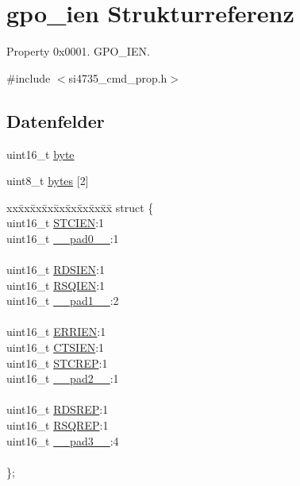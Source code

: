 \hypertarget{uniongpo__ien}{}\section{gpo\+\_\+ien Strukturreferenz}
\label{uniongpo__ien}


Property 0x0001. G\+P\+O\+\_\+\+I\+E\+N.  




{\ttfamily \#include $<$si4735\+\_\+cmd\+\_\+prop.\+h$>$}

\subsection*{Datenfelder}
\begin{DoxyCompactItemize}
\item 
uint16\+\_\+t \hyperlink{uniongpo__ien_ab0549c1b5ea980a02e7eab77e21fea49}{byte}
\item 
uint8\+\_\+t \hyperlink{uniongpo__ien_a46e4c05d20a047ec169f60d3167e912e}{bytes} \mbox{[}2\mbox{]}
\item 
\begin{tabbing}
xx\=xx\=xx\=xx\=xx\=xx\=xx\=xx\=xx\=\kill
struct \{\\
\>uint16\_t \hyperlink{uniongpo__ien_ad9adfb2ddca813d59dcc9361db43dcb3}{STCIEN}:1\\
\>uint16\_t \hyperlink{uniongpo__ien_a77132c2c26a75f5b8751b235cda23828}{\_\_pad0\_\_}:1\\
\>\\
\>uint16\_t \hyperlink{uniongpo__ien_ae79eafa6dcf4c70810372eee4930d5bc}{RDSIEN}:1\\
\>uint16\_t \hyperlink{uniongpo__ien_a3f5edb9c295e1e92b34232c9f3a6cfa1}{RSQIEN}:1\\
\>uint16\_t \hyperlink{uniongpo__ien_ab72e3a1f2f7db8695c60c658f5a0f11a}{\_\_pad1\_\_}:2\\
\>\\
\>uint16\_t \hyperlink{uniongpo__ien_a0523a5e19216a16b04bb981453c60664}{ERRIEN}:1\\
\>uint16\_t \hyperlink{uniongpo__ien_a7790e2a270c4400498be7ba34cfaac5e}{CTSIEN}:1\\
\>uint16\_t \hyperlink{uniongpo__ien_a8a57a750de6cf1d2805c1c6895208811}{STCREP}:1\\
\>uint16\_t \hyperlink{uniongpo__ien_a82701c5ec65a0fca9a84d8edc46a8192}{\_\_pad2\_\_}:1\\
\>\\
\>uint16\_t \hyperlink{uniongpo__ien_ab3e7ebd5f6d308aa08db65fae6cd5ebe}{RDSREP}:1\\
\>uint16\_t \hyperlink{uniongpo__ien_aabc41880837bbe6b1716b6708f4d5c8c}{RSQREP}:1\\
\>uint16\_t \hyperlink{uniongpo__ien_a1b0a1a9de051f3174325808d959500f7}{\_\_pad3\_\_}:4\\
\>\\
\}; \\

\end{tabbing}\end{DoxyCompactItemize}


